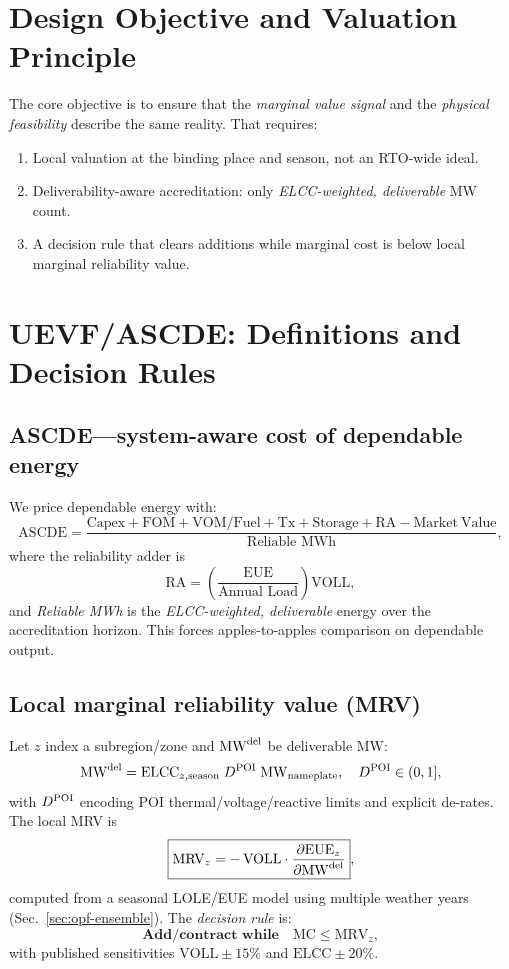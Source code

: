 \documentclass[11pt]{article}
\newcommand{\ELCC}{\ensuremath{\mathrm{ELCC}}}
\newcommand{\VOLL}{\ensuremath{\mathrm{VOLL}}}
\newcommand{\EUE}{\ensuremath{\mathrm{EUE}}}
\newcommand{\ASCDE}{\ensuremath{\mathrm{ASCDE}}}
\newcommand{\MRV}{\ensuremath{\mathrm{MRV}}}
\newcommand{\MC}{\ensuremath{\mathrm{MC}}}
\numberwithin{equation}{section}
\theoremstyle{definition}
\theoremstyle{remark}
\begin{document}
\section{Design Objective and Valuation Principle}
The core objective is to ensure that the \emph{marginal value signal} and the \emph{physical feasibility} describe the same reality. That requires:
\begin{enumerate}[leftmargin=1.2em]
\item Local valuation at the binding place and season, not an RTO-wide ideal.
\item Deliverability-aware accreditation: only \emph{ELCC-weighted, deliverable} MW count.
\item A decision rule that clears additions while marginal cost is below local marginal reliability value.
\end{enumerate}

\section{UEVF/ASCDE: Definitions and Decision Rules}
\subsection{ASCDE---system-aware cost of dependable energy}
We price dependable energy with:
\begin{equation}
\ASCDE = \frac{\mathrm{Capex}+\mathrm{FOM}+\mathrm{VOM/Fuel}+\mathrm{Tx}+\mathrm{Storage}+\mathrm{RA}-\mathrm{Market\ Value}}{\text{Reliable MWh}},
\end{equation}
where the reliability adder is
\begin{equation}
\mathrm{RA} = \left(\frac{\EUE}{\text{Annual Load}}\right)\VOLL,
\end{equation}
and \emph{Reliable MWh} is the \emph{ELCC-weighted, deliverable} energy over the accreditation horizon. This forces apples-to-apples comparison on dependable output.

\subsection{Local marginal reliability value (MRV)}
Let $z$ index a subregion/zone and $\MWdel$ be deliverable MW:
\begin{equation}
\MWdel = \ELCC_{z,\text{season}}\;\Ddel\;\mathrm{MW}_{\text{nameplate}}, \quad \Ddel\in(0,1],
\end{equation}
with $\Ddel$ encoding POI thermal/voltage/reactive limits and explicit de-rates. The local MRV is
\begin{equation}
\boxed{\MRV_z = -\,\VOLL \cdot \frac{\partial \EUE_z}{\partial \MWdel}}, 
\label{eq:MRV}
\end{equation}
computed from a seasonal LOLE/EUE model using multiple weather years (Sec.~\ref{sec:opf-ensemble}). The \emph{decision rule} is:
\begin{equation}
\textbf{Add/contract while}\quad \MC \le \MRV_z,
\end{equation}
with published sensitivities $\VOLL \pm 15\%$ and $\ELCC \pm 20\%$.
\end{document}
